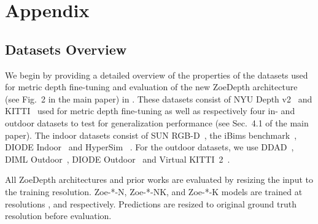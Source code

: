 \documentclass[10pt,twocolumn,letterpaper]{article}
\begin{document}
\clearpage
{\small


}
\clearpage

\appendix
\section{Appendix}
\subsection{Datasets Overview} 
\label{sec:datasets-overview}
We begin by providing a detailed overview of the properties of the datasets used for metric depth fine-tuning and evaluation of the new ZoeDepth architecture (see Fig.~2 in the main paper) in . These datasets consist of NYU Depth v2~\cite{Silberman2012} and  KITTI~\cite{Menze_2015_CVPR} used for metric depth fine-tuning as well as respectively four in- and outdoor datasets to test for generalization performance (see Sec.~4.1 of the main paper). The indoor datasets consist of SUN RGB-D~\cite{Song2015_sunrgbd}, the iBims benchmark~\cite{koch2019}, DIODE Indoor~\cite{diode_dataset} and HyperSim ~\cite{roberts:2021}. For the outdoor datasets, we use DDAD~\cite{packnet}, DIML Outdoor~\cite{kim2018deep}, DIODE Outdoor~\cite{diode_dataset} and Virtual KITTI~2~\cite{cabon2020vkitti2}.

All ZoeDepth architectures and prior works are evaluated by resizing the input to the training resolution. Zoe-*-N, Zoe-*-NK, and Zoe-*-K models are trained at resolutions ,  and  respectively. Predictions are resized to original ground truth resolution before evaluation.
\end{document}
